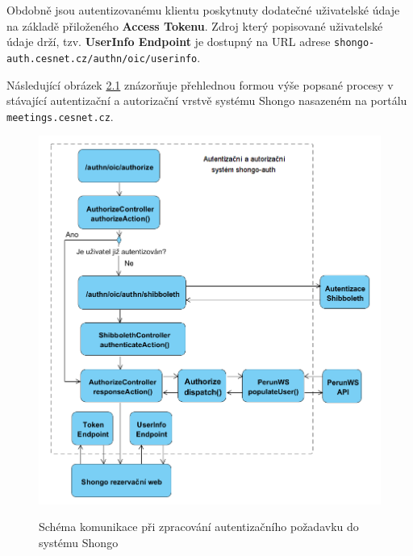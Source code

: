 \documentclass[
  printed, %
  twoside, %
  table,   %
  nolof,     %
  nolot,     %
]{fithesis3}
\begin{document}
Obdobně jsou autentizovanému klientu poskytnuty dodatečné uživatelské údaje na základě přiloženého \textbf{Access Tokenu}. Zdroj který popisované uživatelské údaje drží, tzv. \textbf{UserInfo Endpoint} je dostupný na URL adrese \texttt{shongo-auth.cesnet.cz/authn/oic/userinfo}.  \par 

Následující obrázek \hyperref[fig:shongoAuthnProcess]{2.1} znázorňuje přehlednou formou výše popsané procesy v stávající autentizační a autorizační vrstvě systému Shongo nasazeném na portálu \texttt{meetings.cesnet.cz}. 

\begin{figure}[H]
\caption{Schéma komunikace při zpracování autentizačního požadavku do systému Shongo}
\centering
\includegraphics[width=12.8cm]{pics/shongoAuthSystem} 
\label{fig:shongoAuthnProcess}
\end{figure}
\par 
\end{document}
